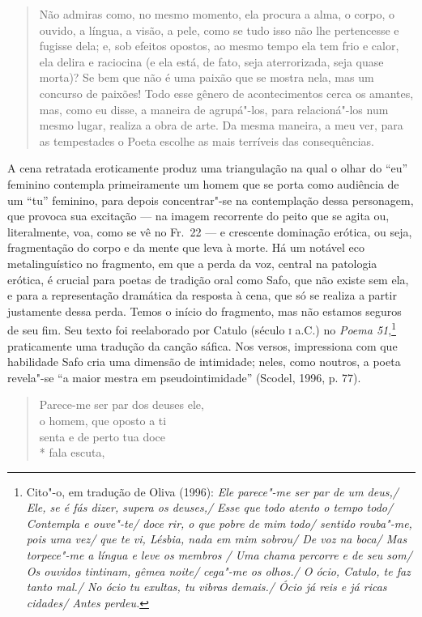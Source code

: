 {{\begin{quote}
Não admiras como, no mesmo momento, ela
procura a alma, o corpo, o ouvido, a língua, a visão, a pele, como se tudo isso
não lhe pertencesse e fugisse dela; e, sob efeitos opostos, ao mesmo tempo ela
tem frio e calor, ela delira e raciocina (e ela está, de fato, seja
aterrorizada, seja quase morta)? Se bem que não é uma paixão que se mostra
nela, mas um concurso de paixões! Todo esse gênero de acontecimentos cerca os
amantes, mas, como eu disse, a maneira de agrupá"-los, para relacioná"-los num
mesmo lugar, realiza a obra de arte. Da mesma maneira, a meu ver, para as
tempestades o Poeta escolhe as mais terríveis das consequências.
\end{quote}

A cena retratada eroticamente produz uma triangulação na qual o olhar do “eu”
feminino contempla primeiramente um homem que se porta como audiência de um
“tu” feminino, para depois concentrar"-se na contemplação dessa
personagem, que provoca sua excitação --- na imagem recorrente do peito que se agita ou,
literalmente, voa, como se vê no Fr.~22 --- e crescente dominação erótica, ou
seja, fragmentação do corpo e da mente que leva à morte. Há um notável eco
metalinguístico no fragmento, em que a perda da voz, central na patologia
erótica, é crucial para poetas de tradição oral como Safo, que não existe sem
ela, e para a representação dramática da resposta à cena, que só se realiza a
partir justamente dessa perda. Temos o início do fragmento, mas não estamos
seguros de seu fim. Seu texto foi reelaborado por Catulo (século \textsc{i}
a.C.) no \textit{Poema 51},\footnote{ Cito"-o, em tradução de Oliva (1996):
\textit{Ele parece"-me ser par de um deus,/ Ele, se é fás dizer, supera os
deuses,/ Esse que todo atento o tempo todo/ Contempla e ouve"-te/ doce rir, o
que pobre de mim todo/ sentido rouba"-me, pois uma vez/ que te vi, Lésbia,
nada em mim sobrou/ De voz na boca/ Mas torpece"-me a língua e leve os membros
/ Uma chama percorre e de seu som/ Os ouvidos tintinam, gêmea noite/ cega"-me
os olhos./ O ócio, Catulo, te faz tanto mal./ No ócio tu exultas, tu vibras
demais./ Ócio já reis e já ricas cidades/ Antes perdeu.}} praticamente uma
tradução da canção sáfica.
Nos versos, impressiona com que habilidade Safo cria uma dimensão de intimidade; neles, como noutros, a poeta revela"-se “a maior mestra em pseudointimidade” (Scodel, 1996, p. 77).}

\begin{verse}
Parece-me ser par dos deuses ele,\\
o homem, que oposto a ti\\
senta e de perto tua doce\\*
fala escuta,


\end{verse}}
